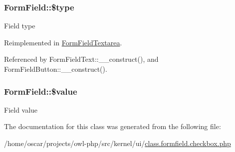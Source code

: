 \subsubsection[{\$type}]{\setlength{\rightskip}{0pt plus 5cm}FormField::\$type}\label{classFormField_a37bed21a1891e95be0e4a697e45ba51b}
Field type 

Reimplemented in \hyperlink{classFormFieldTextarea_a85348034822c70694fc8640bfcacc04d}{FormFieldTextarea}.



Referenced by FormFieldText::\_\-\_\-construct(), and FormFieldButton::\_\-\_\-construct().

\subsubsection[{\$value}]{\setlength{\rightskip}{0pt plus 5cm}FormField::\$value}\label{classFormField_a3c01e89834248eec8e2f145fbcfa0fbc}
Field value 

The documentation for this class was generated from the following file:\begin{DoxyCompactItemize}
\item 
/home/oscar/projects/owl-\/php/src/kernel/ui/\hyperlink{class_8formfield_8checkbox_8php}{class.formfield.checkbox.php}\end{DoxyCompactItemize}
